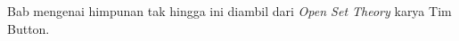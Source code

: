 \documentclass[../../../include/open-logic-chapter]{subfiles}
\begin{document}

\begin{editorial}
Bab mengenai himpunan tak hingga ini diambil dari \emph{Open Set Theory}
karya Tim Button.
\end{editorial}

\end{document}
